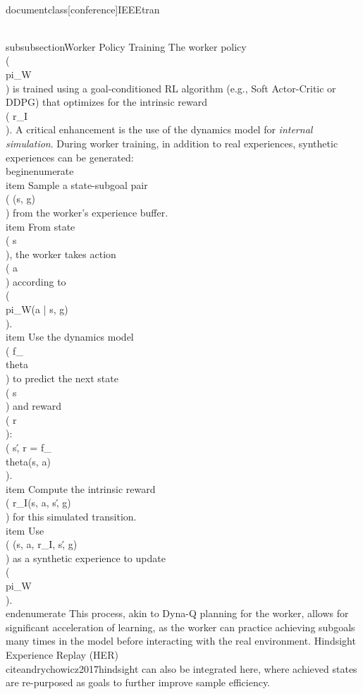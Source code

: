 \\documentclass[conference]{IEEEtran}
\begin{document}
\\subsubsection{Worker Policy Training}
The worker policy \\( \\pi_W \\) is trained using a goal-conditioned RL algorithm (e.g., Soft Actor-Critic or DDPG) that optimizes for the intrinsic reward \\( r_I \\).
A critical enhancement is the use of the dynamics model for \textit{internal simulation}. During worker training, in addition to real experiences, synthetic experiences can be generated:
\\begin{enumerate}
    \\item Sample a state-subgoal pair \\( (s, g) \\) from the worker's experience buffer.
    \\item From state \\( s \\), the worker takes action \\( a \\) according to \\( \\pi_W(a | s, g) \\).
    \\item Use the dynamics model \\( f_\\theta \\) to predict the next state \\( s\' \\) and reward \\( r \\): \\( s\', r = f_\\theta(s, a) \\).
    \\item Compute the intrinsic reward \\( r_I(s, a, s\', g) \\) for this simulated transition.
    \\item Use \\( (s, a, r_I, s\', g) \\) as a synthetic experience to update \\( \\pi_W \\).
\\end{enumerate}
This process, akin to Dyna-Q planning for the worker, allows for significant acceleration of learning, as the worker can practice achieving subgoals many times in the model before interacting with the real environment. Hindsight Experience Replay (HER) \\cite{andrychowicz2017hindsight} can also be integrated here, where achieved states are re-purposed as goals to further improve sample efficiency.
\end{document}
